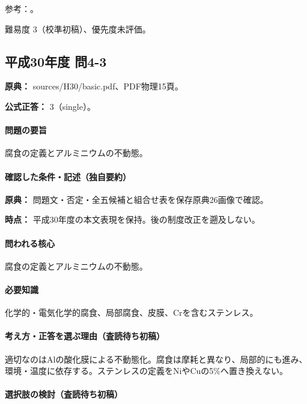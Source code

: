 \par 参考：\cite{chem55_corrosion,nims_hydrogen2024}。

\par 難易度 3（校準初稿）、優先度未評価。

\subsection{平成30年度 問4-3}
\label{q:h30-reg-basic-4-3}

\noindent\textbf{原典：} sources/H30/basic.pdf、PDF物理15頁。

\textbf{公式正答：} 3（single）。

\paragraph{問題の要旨} 腐食の定義とアルミニウムの不動態。

\paragraph{確認した条件・記述（独自要約）}\mbox{}\par

\noindent\textbf{原典：} 問題文・否定・全五候補と組合せ表を保存原典26画像で確認。\par

\noindent\textbf{時点：} 平成30年度の本文表現を保持。後の制度改正を遡及しない。\par

\paragraph{問われる核心} 腐食の定義とアルミニウムの不動態。

\paragraph{必要知識} 化学的・電気化学的腐食、局部腐食、皮膜、Crを含むステンレス。

\paragraph{考え方・正答を選ぶ理由（査読待ち初稿）} 適切なのはAlの酸化膜による不動態化。腐食は摩耗と異なり、局部的にも進み、環境・温度に依存する。ステンレスの定義をNiやCuの5\%へ置き換えない。

\paragraph{選択肢の検討（査読待ち初稿）}\mbox{}\par

